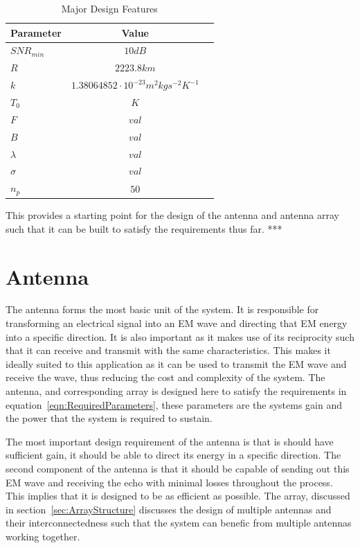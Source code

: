\documentclass[11pt]{witseiepaper}
\begin{document}
\begin{table}[htb]
    \caption{Major Design Features}
    \label{tab:DesignValues}
    \begin{center}
        \begin{tabular}{p{70mm}cp{70mm}}
            \hline 
            Parameter & Value \\
            \hline
            $SNR_{min}$ & $10 dB$ \\
            $R$ & $2223.8 km$ \\
            $k$ & $1.38064852 \cdot 10^{-23} m^2 kg s^{-2} K^{-1}$ \\
            $T_{0}$ & $K$ \\
            $F$ & $val$ \\
            $B$ & $val$ \\
            $\lambda$ & $val$ \\
            $\sigma$ & $val$ \\
            $n_p$ & $50$ \\
            \hline
        \end{tabular}
    \end{center}
\end{table}


This provides a starting point for the design of the antenna and antenna array such that it can be built to satisfy the requirements thus far.
***

\section{Antenna} \label{sec:Antenna}
The antenna forms the most basic unit of the system. It is responsible for transforming an electrical signal into an EM wave and directing that EM energy into a specific direction. It is also important as it makes use of its reciprocity such that it can receive and transmit with the same characteristics. This makes it ideally suited to this application as it can be used to transmit the EM wave and receive the wave, thus reducing the cost and complexity of the system.
The antenna, and corresponding array is designed here to satisfy the requirements in equation~\ref{eqn:RequiredParameters}, these parameters are the systems gain and the power that the system is required to sustain.

The most important design requirement of the antenna is that is should have sufficient gain, it should be able to direct its energy in a specific direction. The second component of the antenna is that it should be capable of sending out this EM wave and receiving the echo with minimal losses throughout the process. This implies that it is designed to be as efficient as possible.
The array, discussed in section~\ref{sec:ArrayStructure} discusses the design of multiple antennas and their interconnectedness such that the system can benefic from multiple antennas working together.
\end{document}
